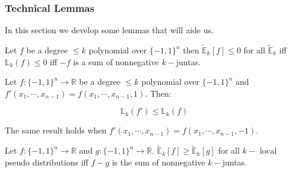 
\subsubsection{Technical Lemmas}
In this section we develop some lemmas that will aide us.
\begin{lemma}\label{equivalence_lk_juntas}
Let $f$ be a degree $\leq k$ polynomial over $\{-1,1\}^n$ then $\tilde{\mathbb{E}}_k[f] \leq 0$ for all $\tilde{\mathbb{E}}_k$ iff  $\mathbb{L}_k(f) \leq 0$ iff $-f$ is a sum of nonnegative $k-$juntas.
\end{lemma}


\begin{lemma}

Let $f : \{-1,1\}^n \rightarrow \mathbb{R}$ be a degree $\leq k$ polynomial over $\{-1,1\}^n$ and $f'(x_1, \cdots, x_{n-1}) = f(x_1, \cdots, x_{n-1}, 1)$. Then:

\begin{equation}
\mathbb{L}_k(f') \leq \mathbb{L}_k(f)
\end{equation}

The same result holds when $f'(x_1, \cdots, x_{n-1}) = f(x_1, \cdots, x_{n-1}, -1)$.
\end{lemma}


\begin{corollary}
Let $f:\{-1,1\}^n\rightarrow \mathbb{R}$ and $g:\{-1,1\}^n \rightarrow \mathbb{R}$. $\tilde{\mathbb{E}}_k[f] \geq \tilde{\mathbb{E}}_k[g]$ for all $k-$ local pseudo distributions iff $f-g$ is the sum of nonnegative $k-$juntas.
\end{corollary}

